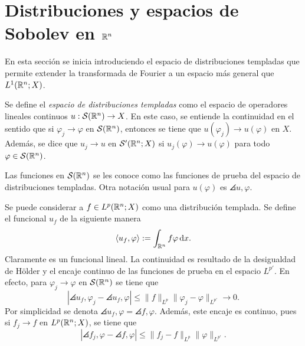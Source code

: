 \section{Distribuciones y espacios de Sobolev en $\mathbb{R}^n$}
En esta sección se inicia introduciendo el espacio de distribuciones templadas
que permite extender la transformada de Fourier a un espacio más general 
que $L^1(\mathbb{R}^n;X)$.
\begin{definition}
    Se define el \textit{espacio de distribuciones templadas} como 
    el espacio de operadores lineales continuos 
    $u:\mathcal{S}(\mathbb{R}^n)\to X$. 
    En este caso, se entiende la continuidad en el sentido que si 
    $\varphi_j\rightarrow\varphi$ en $\mathcal{S}(\mathbb{R}^n)$, entonces se tiene
    que $u(\varphi_j) \rightarrow u(\varphi)$ en $X$. Además, se dice que 
    $u_j\rightarrow u$ en $\mathcal{S}'(\mathbb{R}^n;X)$ si 
    $u_j(\varphi)\rightarrow u(\varphi)$ para todo $\varphi\in \mathcal{S}(\mathbb{R}^n)$.
\end{definition}
Las funciones en $\mathcal{S}(\mathbb{R}^n)$ se les conoce como las funciones de prueba
del espacio de distribuciones templadas. Otra notación usual para $u(\varphi)$
es $\angles{u,\varphi}$.
\begin{remark}
    Se puede considerar a $f\in L^p(\mathbb{R}^n;X)$ como una distribución templada. Se 
    define el funcional $u_f$ de la siguiente manera
    \begin{equation*}
        \langle u_f, \varphi\rangle := \int_{\mathbb{R}^n} f\varphi \mathop{}\!\mathrm{d} x.
    \end{equation*}
    Claramente es un funcional lineal. La continuidad es resultado de la
    desigualdad de H\"older y el encaje continuo de las funciones de prueba
    en el espacio $L^{p'}$. En efecto, para $\varphi_j\rightarrow\varphi$ en 
    $\mathcal{S}(\mathbb{R}^n)$ se tiene que
    \begin{equation*}
        |\angles{u_f, \varphi_j} - \angles{u_f, \varphi}| \leq 
        \|f\|_{L^p}\|\varphi_j - \varphi\|_{L^{p'}} \rightarrow 0.
    \end{equation*}
    Por simplicidad se denota $\angles{u_f, \varphi} = \angles{f, \varphi}$. Además, este encaje es continuo, pues si $f_j\rightarrow f$ en $L^p(\mathbb{R}^n;X)$, se tiene que 
    \begin{equation*}
    	|\angles{f_j, \varphi} - \angles{f, \varphi}| \leq \|f_j-f\|_{L^p}\|\varphi\|_{L^{p'}}.
    \end{equation*}
\end{remark}
